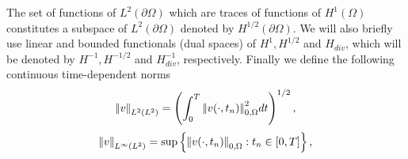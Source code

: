 The set of functions of $L^{2}(\partial \Omega)$ which are traces of functions of $H^{1}(\Omega)$ constitutes a subspace of $L^{2}(\partial \Omega)$ denoted by $H^{1/2}(\partial \Omega)$. We will also briefly use linear and bounded functionals (dual spaces) of $H^{1},H^{1/2}$ and $H_{div}$, which will be denoted by $H^{-1},H^{-1/2}$ and $H_{div}^{-1}$, respectively. Finally we define the following continuous time-dependent norms 
\begin{equation*}
   {\left\vert\kern-0.25ex\left\vert v \right\vert\kern-0.25ex\right\vert}_{L^{2}(L^{2})} = \left( \int_{0}^{T} {\left\vert\kern-0.25ex\left\vert v(\cdot,t_{n}) \right\vert\kern-0.25ex\right\vert}_{0,\Omega}^{2} dt \right)^{1/2}            ,                                                                                                                                                                                                                                                                                                                                                                                                                                                                                                                                                                                                                                                                                                                                                                                                                                                                                                                                                                                                                                                                                         \end{equation*}
   \begin{equation*}
   {\left\vert\kern-0.25ex\left\vert v \right\vert\kern-0.25ex\right\vert}_{L^{\infty}(L^{2})} =  \sup\left\lbrace {\left\vert\kern-0.25ex\left\vert v(\cdot,t_{n}) \right\vert\kern-0.25ex\right\vert}_{0,\Omega} : t_{n} \in [0,T] \right\rbrace,                                                                                                                                                                                                                                                                                                                                                                                                                                                                                                                                                                                                                                                                                                                                                                                                                                                                                                                                                                                                                                                                                                    \end{equation*}
